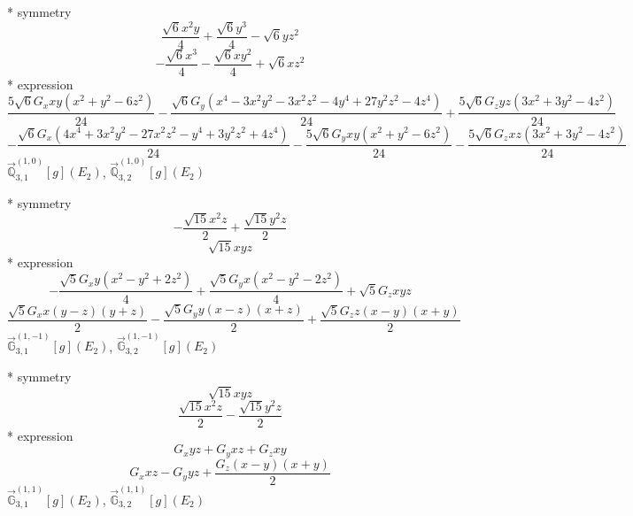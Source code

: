 \documentclass[fleqn,8pt]{jsarticle}
\begin{document}
\noindent\quad ** symmetry
\begin{dmath*}
\frac{\sqrt{6} x^{2} y}{4} + \frac{\sqrt{6} y^{3}}{4} - \sqrt{6} y z^{2}
\end{dmath*}
\begin{dmath*}
- \frac{\sqrt{6} x^{3}}{4} - \frac{\sqrt{6} x y^{2}}{4} + \sqrt{6} x z^{2}
\end{dmath*}
\noindent\quad ** expression
\begin{dmath*}
\frac{5 \sqrt{6} G_{x} x y \left(x^{2} + y^{2} - 6 z^{2}\right)}{24} - \frac{\sqrt{6} G_{y} \left(x^{4} - 3 x^{2} y^{2} - 3 x^{2} z^{2} - 4 y^{4} + 27 y^{2} z^{2} - 4 z^{4}\right)}{24} + \frac{5 \sqrt{6} G_{z} y z \left(3 x^{2} + 3 y^{2} - 4 z^{2}\right)}{24}
\end{dmath*}
\begin{dmath*}
- \frac{\sqrt{6} G_{x} \left(4 x^{4} + 3 x^{2} y^{2} - 27 x^{2} z^{2} - y^{4} + 3 y^{2} z^{2} + 4 z^{4}\right)}{24} - \frac{5 \sqrt{6} G_{y} x y \left(x^{2} + y^{2} - 6 z^{2}\right)}{24} - \frac{5 \sqrt{6} G_{z} x z \left(3 x^{2} + 3 y^{2} - 4 z^{2}\right)}{24}
\end{dmath*}
\noindent\quad $\vec{\mathbb{Q}}_{3,1}^{(1,0)}[g](E_{2})$, $\vec{\mathbb{Q}}_{3,2}^{(1,0)}[g](E_{2})$

\noindent\quad ** symmetry
\begin{dmath*}
- \frac{\sqrt{15} x^{2} z}{2} + \frac{\sqrt{15} y^{2} z}{2}
\end{dmath*}
\begin{dmath*}
\sqrt{15} x y z
\end{dmath*}
\noindent\quad ** expression
\begin{dmath*}
- \frac{\sqrt{5} G_{x} y \left(x^{2} - y^{2} + 2 z^{2}\right)}{4} + \frac{\sqrt{5} G_{y} x \left(x^{2} - y^{2} - 2 z^{2}\right)}{4} + \sqrt{5} G_{z} x y z
\end{dmath*}
\begin{dmath*}
\frac{\sqrt{5} G_{x} x \left(y - z\right) \left(y + z\right)}{2} - \frac{\sqrt{5} G_{y} y \left(x - z\right) \left(x + z\right)}{2} + \frac{\sqrt{5} G_{z} z \left(x - y\right) \left(x + y\right)}{2}
\end{dmath*}
\noindent\quad $\vec{\mathbb{G}}_{3,1}^{(1,-1)}[g](E_{2})$, $\vec{\mathbb{G}}_{3,2}^{(1,-1)}[g](E_{2})$

\noindent\quad ** symmetry
\begin{dmath*}
\sqrt{15} x y z
\end{dmath*}
\begin{dmath*}
\frac{\sqrt{15} x^{2} z}{2} - \frac{\sqrt{15} y^{2} z}{2}
\end{dmath*}
\noindent\quad ** expression
\begin{dmath*}
G_{x} y z + G_{y} x z + G_{z} x y
\end{dmath*}
\begin{dmath*}
G_{x} x z - G_{y} y z + \frac{G_{z} \left(x - y\right) \left(x + y\right)}{2}
\end{dmath*}
\noindent\quad $\vec{\mathbb{G}}_{3,1}^{(1,1)}[g](E_{2})$, $\vec{\mathbb{G}}_{3,2}^{(1,1)}[g](E_{2})$
\end{document}
